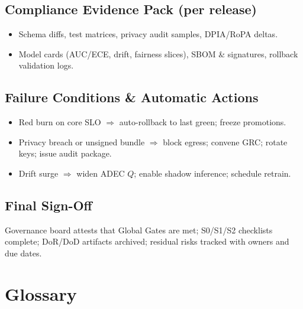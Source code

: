 \documentclass[11pt]{article}
\theoremstyle{plain}
\begin{document}
\subsection{Compliance Evidence Pack (per release)}
\begin{itemize}
  \item Schema diffs, test matrices, privacy audit samples, DPIA/RoPA deltas.
  \item Model cards (AUC/ECE, drift, fairness slices), SBOM \& signatures, rollback validation logs.
\end{itemize}

\subsection{Failure Conditions \& Automatic Actions}
\begin{itemize}
  \item Red burn on core SLO $\Rightarrow$ auto-rollback to last green; freeze promotions.
  \item Privacy breach or unsigned bundle $\Rightarrow$ block egress; convene GRC; rotate keys; issue audit package.
  \item Drift surge $\Rightarrow$ widen ADEC $Q$; enable shadow inference; schedule retrain.
\end{itemize}

\subsection{Final Sign-Off}
Governance board attests that Global Gates are met; S0/S1/S2 checklists complete; DoR/DoD artifacts archived; residual risks tracked with owners and due dates.

\section{Glossary}
\end{document}
